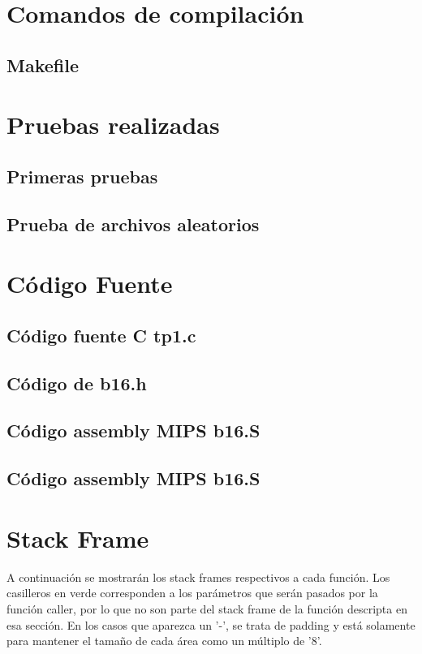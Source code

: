 \documentclass{article}
\begin{document}
\section{Comandos de compilación}
\subsection{Makefile}


\section{Pruebas realizadas}
\subsection{Primeras pruebas}

\subsection{Prueba de archivos aleatorios}


\section{C\'odigo Fuente}
\subsection{C\'odigo fuente C tp1.c}

\subsection{C\'odigo de b16.h}

\subsection{C\'odigo assembly MIPS b16.S}

\subsection{C\'odigo assembly MIPS b16.S}


\section{Stack Frame}
A continuación se mostrarán los stack frames respectivos a cada función. Los casilleros en verde corresponden a los parámetros que serán pasados por la función caller, por lo que no son parte del stack frame de la función descripta en esa sección.
En los casos que aparezca un '-', se trata de padding y está solamente para mantener el tamaño de cada área como un múltiplo de '8'.
\end{document}
